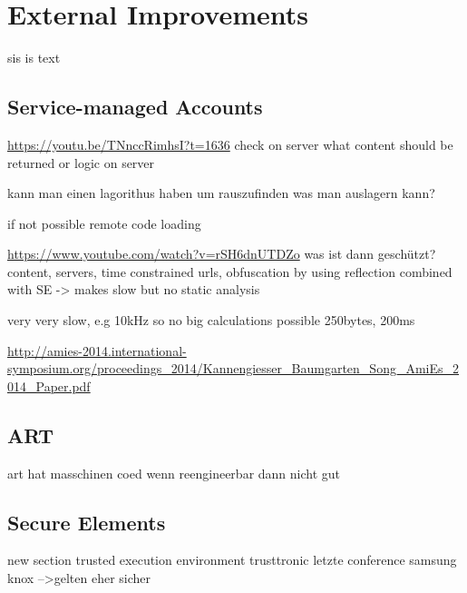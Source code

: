 \section{External Improvements}\label{section:external}
sis is text
\subsection{Service-managed Accounts}
\url{https://youtu.be/TNnccRimhsI?t=1636}\newline
check on server what content should be returned or logic on server\newline

kann man einen lagorithus haben um rauszufinden was man auslagern kann?\newline

if not possible remote code loading\newline

\url{https://www.youtube.com/watch?v=rSH6dnUTDZo}
was ist dann geschützt? content, servers, time constrained urls, obfuscation by using reflection combined with SE -> makes slow but no static analysis\newline

very very slow, e.g 10kHz so no big calculations possible\newline
250bytes, 200ms \newline

\url{http://amies-2014.international-symposium.org/proceedings_2014/Kannengiesser_Baumgarten_Song_AmiEs_2014_Paper.pdf}\newline

\subsection{ART}\label{subsection:external-art}
art hat masschinen coed\newline
wenn reengineerbar dann nicht gut

\subsection{Secure Elements}\label{subsection:external-secure}



new section trusted execution environment
trusttronic letzte conference
samsung knox
-->gelten eher sicher
